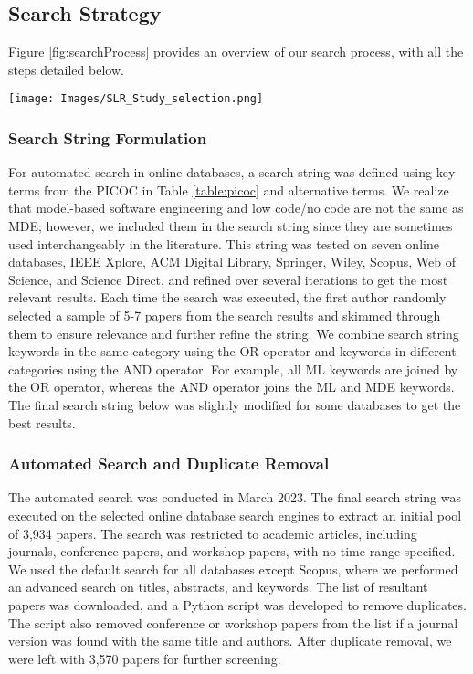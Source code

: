 \subsection{Search Strategy}
Figure \ref{fig:searchProcess} provides an overview of our search process, with all the steps detailed below.

\begin{figure*}[htbp]
    \centering
    \texttt{[image: Images/SLR\_Study\_selection.png]}
    \caption{Study Search Process}
    \label{fig:searchProcess}
    \vspace*{-1em}
\end{figure*}

\subsubsection{Search String Formulation}
For automated search in online databases, a search string was defined using key terms from the PICOC in Table \ref{table:picoc} and alternative terms. We realize that model-based software engineering and low code/no code are not the same as MDE; however, we included them in the search string since they are sometimes used interchangeably in the literature. This string was tested on seven online databases, IEEE Xplore, ACM Digital Library, Springer, Wiley, Scopus, Web of Science, and Science Direct, and refined over several iterations to get the most relevant results. Each time the search was executed, the first author randomly selected a sample of 5-7 papers from the search results and skimmed through them to ensure relevance and further refine the string. We combine search string keywords in the same category using the OR operator and keywords in different categories using the AND operator. For example, all ML keywords are joined by the OR operator, whereas the AND operator joins the ML and MDE keywords. The final search string below was slightly modified for some databases to get the best results. 
 
\subsubsection{Automated Search and Duplicate Removal}
The automated search was conducted in March 2023. The final search string was executed on the selected online database search engines to extract an initial pool of 3,934 papers. The search was restricted to academic articles, including journals, conference papers, and workshop papers, with no time range specified. We used the default search for all databases except Scopus, where we performed an advanced search on titles, abstracts, and keywords. The list of resultant papers was downloaded, and a Python script was developed to remove duplicates. The script also removed conference or workshop papers from the list if a journal version was found with the same title and authors. After duplicate removal, we were left with 3,570 papers for further screening.

